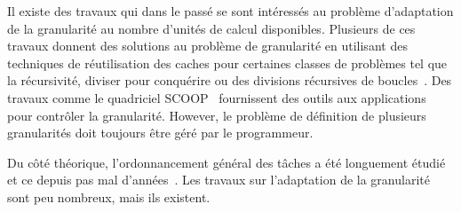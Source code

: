 Il existe des travaux qui dans le passé se sont intéressés au problème d'adaptation de la granularité au nombre d'unités de calcul disponibles.
%
Plusieurs de ces travaux donnent des solutions au problème de granularité en utilisant des techniques de réutilisation des caches pour certaines classes de problèmes tel que la récursivité, diviser pour conquérire ou des divisions récursives de boucles~\cite{unifieddataflow,Intel::TBB,Cilk,xkaapi,taskscomparison}.
%
Des travaux comme le quadriciel SCOOP~\cite{scoopp} fournissent des outils aux applications pour contrôler la granularité.
%
However, le problème de définition de plusieurs granularités doit toujours être géré par le programmeur.


Du côté théorique, l'ordonnancement général des tâches a été longuement étudié et ce depuis pas mal d'années~\cite{Khan94acomparison,heft}.
%
Les travaux sur l'adaptation de la granularité sont peu nombreux, mais ils existent. 
